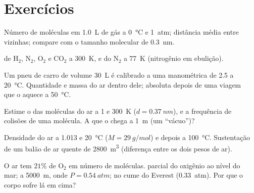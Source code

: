 \section{Exercícios}

\begin{exercise}[$\star$]\label{exo:b1:kinetic-theory:1}
Número de moléculas em \qty{1.0}{L} de gás a \qty{0}{\degreeCelsius} e
\qty{1}{atm}; distância média entre vizinhas; compare com o tamanho
molecular de \qty{0.3}{nm}.
\end{exercise}

\begin{exercise}[$\star$]\label{exo:b1:kinetic-theory:2}
 de H$_2$, N$_2$, O$_2$ e CO$_2$ a \qty{300}{K},
e do N$_2$ a \qty{77}{K} (nitrogênio em ebulição).
\end{exercise}

\begin{exercise}[$\star$]\label{exo:b1:kinetic-theory:3}
Um pneu de carro de volume \qty{30}{L} é calibrado a uma  manométrica de
\qty{2.5}{} a \qty{20}{\degreeCelsius}. Quantidade e massa do ar dentro dele;
 absoluta depois de uma viagem que o aquece a \qty{50}{\degreeCelsius}.
\end{exercise}

\begin{exercise}[$\star$]\label{exo:b1:kinetic-theory:4}
Estime o  das moléculas do ar a \qty{1}{} e \qty{300}{K}
($d = \qty{0.37}{nm}$), e a frequência de colisões de uma molécula. A que
 o  chega a \qty{1}{m} (um ``vácuo'')?
\end{exercise}

\begin{exercise}[$\star\star$]\label{exo:b1:kinetic-theory:5}
Densidade do ar a \qty{1.013}{} e \qty{20}{\degreeCelsius}
($M = \qty{29}{g/mol}$) e depois a \qty{100}{\degreeCelsius}. Sustentação de um
balão de ar quente de \qty{2800}{m^3} (diferença entre os dois pesos de ar).
\end{exercise}

\begin{exercise}[$\star\star$]\label{exo:b1:kinetic-theory:6}
O ar tem $21\%$ de O$_2$ em número de moléculas.  parcial do oxigênio ao nível do mar;
a \qty{5000}{m}, onde $P = \qty{0.54}{atm}$; no cume do Everest
(\qty{0.33}{atm}). Por que o corpo sofre lá em cima?
\end{exercise}

